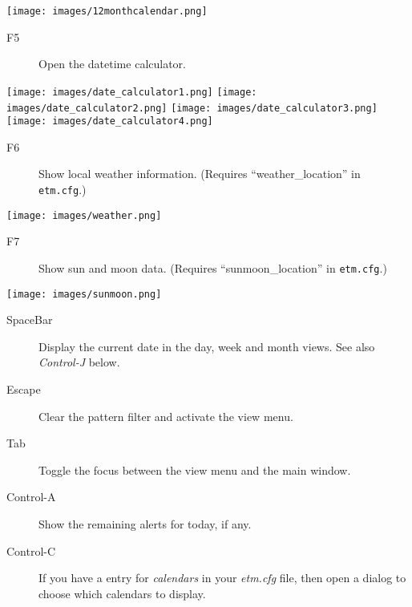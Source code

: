 \documentclass[]{article}
\makeatletter
\def\maxwidth{\ifdim\Gin@nat@width>\linewidth\linewidth
\else\Gin@nat@width\fi}
\let\Oldincludegraphics\includegraphics
\renewcommand{\includegraphics}[1]{\Oldincludegraphics[width=\maxwidth]{#1}}
\makeatother
\begin{document}
\texttt{[image: images/12monthcalendar.png]}
\begin{description}
\item[F5]
Open the datetime calculator.
\end{description}

\texttt{[image: images/date\_calculator1.png]}
\texttt{[image: images/date\_calculator2.png]}
\texttt{[image: images/date\_calculator3.png]}
\texttt{[image: images/date\_calculator4.png]}
\begin{description}
\item[F6]
Show local weather information. (Requires ``weather\_location'' in
\texttt{etm.cfg}.)
\end{description}

\texttt{[image: images/weather.png]}
\begin{description}
\item[F7]
Show sun and moon data. (Requires ``sunmoon\_location'' in
\texttt{etm.cfg}.)
\end{description}

\texttt{[image: images/sunmoon.png]}
\begin{description}
\item[SpaceBar]
Display the current date in the day, week and month views. See also
\emph{Control-J} below.
\item[Escape]
Clear the pattern filter and activate the view menu.
\item[Tab]
Toggle the focus between the view menu and the main window.
\item[Control-A]
Show the remaining alerts for today, if any.
\item[Control-C]
If you have a entry for \emph{calendars} in your \emph{etm.cfg} file,
then open a dialog to choose which calendars to display.
\end{description}
\end{document}

